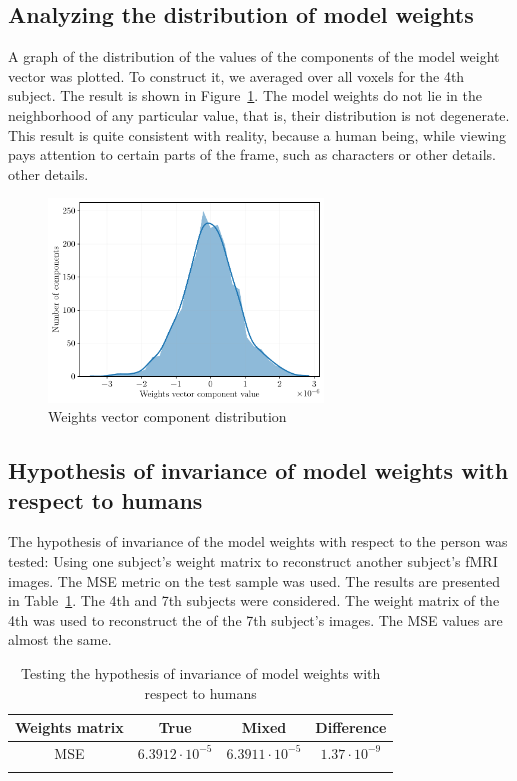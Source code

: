 \documentclass[sn-mathphys-num]{sn-jnl}%
\theoremstyle{thmstyleone}%
\theoremstyle{thmstyletwo}%
\theoremstyle{thmstylethree}%
\begin{document}
\subsection{Analyzing the distribution of model weights}

A graph of the distribution of the values of the components of the model weight vector was plotted.
To construct it, we averaged over all voxels for the 4th subject.
The result is shown in Figure~\ref{fig:w-distr}.
The model weights do not lie in the neighborhood of any particular value, 
that is, their distribution is not degenerate.
This result is quite consistent with reality, because a human being, while viewing
pays attention to certain parts of the frame, such as characters or other details.
other details.

\begin{figure}[h!]
	\centering
	\includegraphics[width=0.65\textwidth]{distribution.pdf}
	\caption{Weights vector component distribution}
	\label{fig:w-distr}
\end{figure}

\subsection{Hypothesis of invariance of model weights with respect to humans}

The hypothesis of invariance of the model weights with respect to the person was tested:
Using one subject's weight matrix to reconstruct another subject's fMRI images.
The MSE metric on the test sample was used.
The results are presented in Table~\ref{table:inv}.
The 4th and 7th subjects were considered. The weight matrix of the 4th was used to reconstruct the
of the 7th subject's images.
The MSE values are almost the same.

\begin{table}[h!]
\caption{Testing the hypothesis of invariance of model weights with respect to humans}\label{table:inv}
\begin{tabular}{@{}cccc@{}}
\toprule
Weights matrix & True & Mixed  & Difference \\
\midrule
MSE & $6.3912 \cdot 10^{-5}$ & $6.3911 \cdot 10^{-5}$ & $1.37 \cdot 10^{-9}$ \\
\botrule
\end{tabular}
\end{table}
\end{document}
